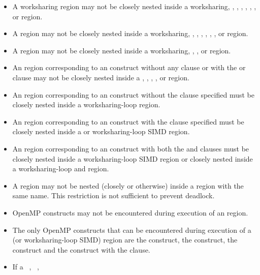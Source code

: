 \begin{itemize}
\item A worksharing region may not be closely nested inside a worksharing,
      , , , , ,
      , or  region.
\item A  region may not be closely nested inside a worksharing,
      , , , , ,
      , or  region.
\item A  region may not be closely nested inside a worksharing,
      , , or  region.
\item An  region corresponding to an  construct
      without any clause or with the  or  clause 
      may not be closely nested inside a , , 
      , , or  region.
\item An  region corresponding to an  construct 
      without the  clause specified must be closely nested inside 
      a worksharing-loop region.
\item An  region corresponding to an  construct 
      with the  clause specified must be closely nested inside a 
       or worksharing-loop SIMD region.
\item An  region corresponding to an  construct 
      with both the  and  clauses must be closely 
      nested inside a worksharing-loop SIMD region or closely nested inside 
      a worksharing-loop and  region.
\item A  region may not be nested (closely or otherwise) inside 
      a  region with the same name. This restriction is not 
      sufficient to prevent deadlock.
\item OpenMP constructs may not be encountered during execution of an
       region.
\item The only OpenMP constructs that can be encountered during execution of a
       (or worksharing-loop SIMD) region are the  construct,
      the  construct, the  construct and the  
      construct with the  clause.
\item If a ~, ~,

\end{itemize}
